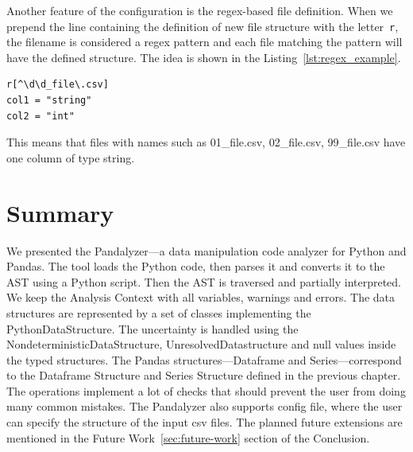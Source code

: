 Another feature of the configuration is the regex-based file definition.
When we prepend the line containing the definition of new file structure with the letter~\verb|r|, the filename is
considered a regex pattern and each file matching the pattern will have the defined structure.
The idea is shown in the Listing~\ref{lst:regex_example}.

\begin{lstlisting}[caption=An example regex-based file definition, label={lst:regex_example}, captionpos=b]
r[^\d\d_file\.csv]
col1 = "string"
col2 = "int"
\end{lstlisting}

This means that files with names such as 01\_file.csv, 02\_file.csv, 99\_file.csv have one column of type string.

\section*{Summary}

We presented the Pandalyzer---a data manipulation code analyzer for Python and Pandas.
The tool loads the Python code, then parses it and converts it to the AST using a Python script.
Then the AST is traversed and partially interpreted.
We keep the Analysis Context with all variables, warnings and errors.
The data structures are represented by a set of classes implementing the PythonDataStructure.
The uncertainty is handled using the NondeterministicDataStructure, UnresolvedDatastructure and null values inside the
typed structures.
The Pandas structures---Dataframe and Series---correspond to the Dataframe Structure and Series Structure defined
in the previous chapter.
The operations implement a lot of checks that should prevent the user from doing many common mistakes.
The Pandalyzer also supports config file, where the user can specify the structure of the input csv files.
The planned future extensions are mentioned in the Future Work~\ref{sec:future-work} section of the Conclusion.